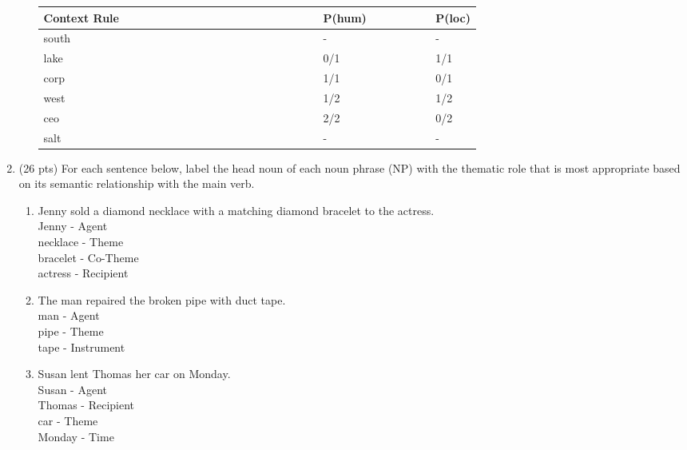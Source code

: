 \documentclass[11pt]{article}
\begin{document}
\begin{enumerate}
\begin{enumerate}
   \begin{center} 
    \begin{tabular}{lll} 
   \textbf{Context Rule~~~~~~~~~~~~~~~~~~~~~~~~~~~~~~} &
   \textbf{P({\sc hum)~~~~~~~~~}} & \textbf{P({\sc loc})} \\ \hline
       south & - & - \\ 
       lake & 0/1 & 1/1 \\
       corp & 1/1 & 0/1 \\
       west & 1/2 & 1/2 \\
       ceo & 2/2 & 0/2 \\
       salt & - & - \\ \hline
       
   \end{tabular}
   \end{center}
 \vspace*{.2in}


\end{enumerate}

\newpage

\item (26 pts) For each sentence below, label the head noun of each noun
  phrase (NP) with the thematic role that is most appropriate based on its
  semantic relationship with the main verb.  

\begin{enumerate}

\item Jenny sold a diamond necklace with a matching diamond bracelet to
  the actress.  \\ 
  Jenny  - Agent  \\
  necklace - Theme \\
  bracelet - Co-Theme \\
  actress -  Recipient\\

\item The man repaired the broken pipe with duct tape.  \\ 
man - Agent\\
pipe - Theme\\
tape -  Instrument\\

\item Susan lent Thomas her car on Monday.  \\ 
Susan   - Agent\\
Thomas - Recipient\\
car - Theme\\
Monday - Time \\


\end{enumerate}
\end{enumerate}
\end{document}
